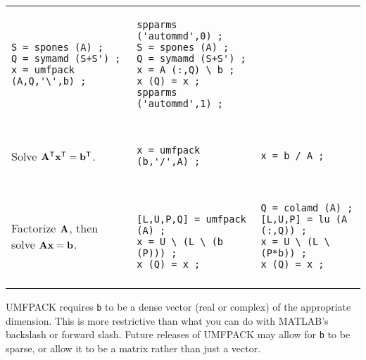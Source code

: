 \begin{table}
{\begin{tabular}{l|l|l}
\begin{minipage}[t]{2.2in}
\begin{verbatim}
S = spones (A) ;
Q = symamd (S+S') ;
x = umfpack (A,Q,'\',b) ;
\end{verbatim}
\end{minipage}
&
\begin{minipage}[t]{2.2in}
\begin{verbatim}
spparms ('autommd',0) ; 
S = spones (A) ;
Q = symamd (S+S') ;
x = A (:,Q) \ b ;
x (Q) = x ;
spparms ('autommd',1) ;
\end{verbatim}
\end{minipage}
 \\
 & & \\
\hline
 & & \\
\begin{minipage}[t]{1.5in}
Solve ${\bf{A}}^{\sf T}{\bf{x}}^{\sf T} = {\bf{b}}^{\sf T}$.
\end{minipage}
&
\begin{minipage}[t]{2.2in}
\begin{verbatim}
x = umfpack (b,'/',A) ;
\end{verbatim}
\end{minipage}
&
\begin{minipage}[t]{2.2in}
\begin{verbatim}
x = b / A ;
\end{verbatim}
\end{minipage}
 \\
 & & \\
\hline
 & & \\
\begin{minipage}[t]{1.5in}
Factorize ${\bf{A}}$, then solve ${\bf{Ax}}={\bf{b}}$.
\end{minipage}
&
\begin{minipage}[t]{2.2in}
\begin{verbatim}

[L,U,P,Q] = umfpack (A) ;
x = U \ (L \ (b (P))) ;
x (Q) = x ;
\end{verbatim}
\end{minipage}
&
\begin{minipage}[t]{2.2in}
\begin{verbatim}
Q = colamd (A) ;
[L,U,P] = lu (A (:,Q)) ;
x = U \ (L \ (P*b)) ;
x (Q) = x ;
\end{verbatim}
\end{minipage}
 \\
 & & \\
\hline
\end{tabular}
}
\end{table}

UMFPACK requires
{\tt b} to be a dense vector (real or complex) of the appropriate dimension.
This is more restrictive than what you can do with MATLAB's
backslash or forward slash.  Future releases of UMFPACK may allow for {\tt b}
to be sparse, or allow it to be a matrix rather than just a vector.

